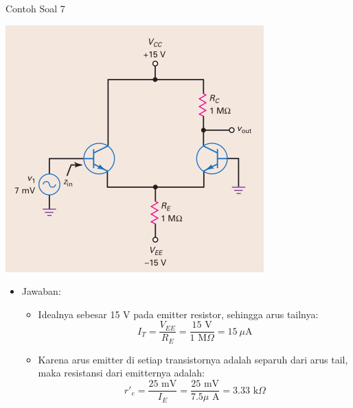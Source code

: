 \documentclass[aspectratio=169]{beamer}
\begin{document}
\begin{frame}{Contoh Soal 7}
	\begin{multicols}{2}
		\begin{center}
			\includegraphics[height=0.7\textheight]{gambar/01.diff-amp/01.contoh_soal_07}
		\end{center}
		\columnbreak
		\begin{itemize}
			\item Jawaban:
			\begin{itemize}
				\item Idealnya sebesar 15 V pada emitter resistor, sehingga arus tailnya:
				\[ I_T = \frac{V_{EE}}{R_E} = \frac{15 \text{ V}}{1 \text{ M}\Omega} = 15~\mu\text{A} \]
				\item Karena arus emitter di setiap transistornya adalah separuh dari arus tail, maka resistansi dari emitternya adalah:
				\[ r'_e = \frac{25 \text{ mV}}{ I_E} =\frac{25 \text{ mV}}{7.5 \mu\text{ A}} = 3.33 \text{ k}\Omega \]
			\end{itemize}
		\end{itemize}
	\end{multicols}
\end{frame}
\end{document}

